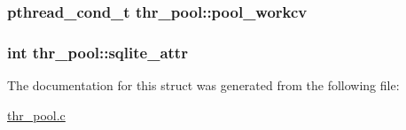 \label{structthr__pool_a49cb54e317337da95c19ead99fd0289f}
\hypertarget{structthr__pool_ad6d898706dd4c525dc6227e5f89f7ddf}{
\subsubsection[{pool\_\-workcv}]{\setlength{\rightskip}{0pt plus 5cm}pthread\_\-cond\_\-t {\bf thr\_\-pool::pool\_\-workcv}}}
\label{structthr__pool_ad6d898706dd4c525dc6227e5f89f7ddf}
\hypertarget{structthr__pool_a07889f76b9822774b2a2a50c91701d71}{
\subsubsection[{sqlite\_\-attr}]{\setlength{\rightskip}{0pt plus 5cm}int {\bf thr\_\-pool::sqlite\_\-attr}}}
\label{structthr__pool_a07889f76b9822774b2a2a50c91701d71}


The documentation for this struct was generated from the following file:\begin{DoxyCompactItemize}
\item 
\hyperlink{thr__pool_8c}{thr\_\-pool.c}\end{DoxyCompactItemize}
